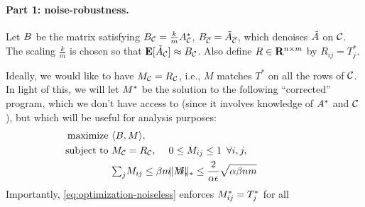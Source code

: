 \paragraph{Part 1: noise-robustness.} Let $B$ be the matrix satisfying 
$B_{\mathcal{C}} = \frac{k}{m}A^*_{\mathcal{C}}$, $B_{\overline{\mathcal{C}}} = \tilde{A}_{\overline{\mathcal{C}}}$, 
which denoises $\tilde{A}$ on $\mathcal{C}$.
The scaling $\frac{k}{m}$ is chosen so that 
$\mathbf{E}[\tilde{A}_{\mathcal{C}}] \approx B_{\mathcal{C}}$.
Also define $R \in \mathbf{R}^{n \times m}$ by $R_{ij} = T_j^*$.

Ideally, we would like to have $M_{\mathcal{C}} = R_{\mathcal{C}}$, i.e., $M$ matches $T^*$ on 
all the rows of $\mathcal{C}$. In light of this, 
we will let $M^*$ be the solution to the following ``corrected'' program, which 
we don't have access to (since it involves knowledge of $A^*$ and $\mathcal{C}$), 
but which will be useful for analysis purposes:
\begin{align}
\label{eq:optimization-noiseless}
\text{maximize } &\langle \Aa, M \rangle, \\
\notag \text{ subject to } &M_{\good} = R_{\good}, 
  &&\hskip-0.4in 0 \leq M_{ij} \leq 1 \,\,\, \forall i,j,  \\
\notag  &{\textstyle \sum_j} M_{ij} \leq \beta m \,\,\, \forall i, 
  &&\hskip-0.4in \|M\|_* \leq \frac{2}{\alpha\epsilon}\sqrt{\alpha\beta nm} \phantom{xxxxxxx}
\end{align}
Importantly, \eqref{eq:optimization-noiseless} enforces $M^*_{ij} = T_j^*$ for all 
